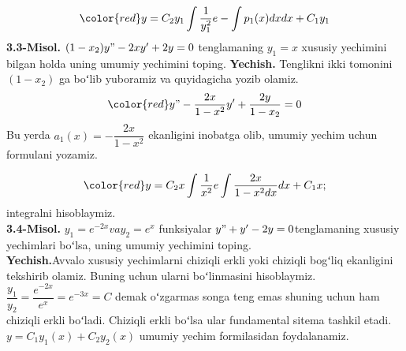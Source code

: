 \documentclass{beamer}
\begin{document}

\begin{frame}
\begin{equation}
\color{red} y = C_{2}y_{1}\int\dfrac{1}{y^{2}_{1}}e-\int{p_{1}(x)dx}dx + C_{1}y_{1}
\end{equation}
\textbf{3.3-Misol.} $(1 - x_{2})y" - 2xy' + 2y = 0$ tenglamaning $y_{1} = x$  xususiy yechimini bilgan holda uning umumiy yechimini toping.
\textbf{Yechish.} Tenglikni ikki tomonini $(1 - x_{2})$ ga boʻlib yuboramiz va quyidagicha yozib olamiz.
\begin{equation}
\color{red} y" - \dfrac{2x}{1 -x^{2}}y' + \dfrac{2y}{1 -x_{2}} = 0
\end{equation}
Bu yerda $a_{1}(x) = -\dfrac{2x}{1 - x^{2}}$ ekanligini inobatga olib, umumiy yechim uchun formulani yozamiz.  
\end{frame}

\begin{frame}
\begin{equation}
\color{red} y = C_{2}x\int\dfrac{1}{x^{2}}e\int\dfrac{2x}{1-x^{2}dx}dx + C_{1}x; 
\end{equation}
integralni hisoblaymiz.\\ 
\textbf{3.4-Misol.} $y_{1} = e^{-2x} va y_{2} = e^{x}$ funksiyalar $y" + y' - 2y = 0$tenglamaning xususiy yechimlari boʻlsa, uning umumiy yechimini toping.\\
\textbf{Yechish.}Avvalo xususiy yechimlarni chiziqli erkli yoki chiziqli bogʻliq ekanligini tekshirib olamiz. Buning uchun ularni boʻlinmasini hisoblaymiz. $\dfrac{y_{1}}{y_{2}} = \dfrac{e^{-2x}}{e^{x}} = e^{-3x} = C$  demak oʻzgarmas songa teng emas shuning uchun ham chiziqli erkli boʻladi. Chiziqli erkli boʻlsa ular fundamental sitema tashkil etadi. $y = C_{1}y_{1}(x) + C_{2}y_{2}(x)$ umumiy yechim formilasidan foydalanamiz. 
\end{frame}

\end{document}
